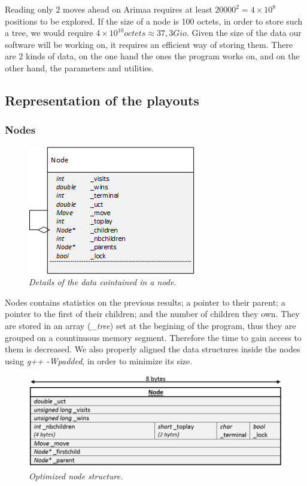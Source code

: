 Reading only 2 moves ahead on Arimaa requires at least \ensuremath{20 000^2 = 4 \times 10^8} positions to be explored. If the size of a node is 100 octets, in order to store such a tree, we would require \ensuremath{4\times10^{10} octets \approx 37,3 Gio}. Given the size of the data our software will be working on, it requires an efficient way of storing them. There are 2 kinds of data, on the one hand the ones the program works on, and on the other hand, the parameters and utilities.
\subsection{Representation of the playouts}

\subsubsection{Nodes}
\begin{figure}[H] 
\centerline{\includegraphics[scale=0.8]{Data_Structure/Img/Node.png}}
\caption{\label{fig:nodedetails}\textit{Details of the data cointained in a node}.}
\end{figure}
Nodes contains statistics on the previous results; a pointer to their parent; a pointer to the first of their children; and the number of children they own. They are stored in an array (\textit{\_tree}) set at the begining of the program, thus they are grouped on a countinuous memory segment. Therefore the time to gain access to them is decreased. We also properly aligned the data structures inside the nodes using \textit{g++ -Wpadded}, in order to minimize its size.
\begin{figure}[H] 
\centerline{\includegraphics[scale=0.4]{Data_Structure/Img/Nodeopti.png}}
\caption{\label{fig:optimizedNode}\textit{Optimized node structure.}}
\end{figure}

